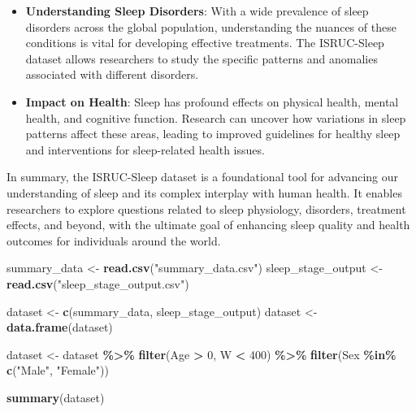 \documentclass[
]{article}
\newenvironment{Shaded}{\begin{snugshade}}{\end{snugshade}}
\newcommand{\DecValTok}[1]{\textcolor[rgb]{0.00,0.00,0.81}{#1}}
\newcommand{\FunctionTok}[1]{\textcolor[rgb]{0.13,0.29,0.53}{\textbf{#1}}}
\newcommand{\NormalTok}[1]{#1}
\newcommand{\OtherTok}[1]{\textcolor[rgb]{0.56,0.35,0.01}{#1}}
\newcommand{\SpecialCharTok}[1]{\textcolor[rgb]{0.81,0.36,0.00}{\textbf{#1}}}
\newcommand{\StringTok}[1]{\textcolor[rgb]{0.31,0.60,0.02}{#1}}
\begin{document}
\begin{itemize}
\item
  \textbf{Understanding Sleep Disorders}: With a wide prevalence of
  sleep disorders across the global population, understanding the
  nuances of these conditions is vital for developing effective
  treatments. The ISRUC-Sleep dataset allows researchers to study the
  specific patterns and anomalies associated with different disorders.
\item
  \textbf{Impact on Health}: Sleep has profound effects on physical
  health, mental health, and cognitive function. Research can uncover
  how variations in sleep patterns affect these areas, leading to
  improved guidelines for healthy sleep and interventions for
  sleep-related health issues.
\end{itemize}

In summary, the ISRUC-Sleep dataset is a foundational tool for advancing
our understanding of sleep and its complex interplay with human health.
It enables researchers to explore questions related to sleep physiology,
disorders, treatment effects, and beyond, with the ultimate goal of
enhancing sleep quality and health outcomes for individuals around the
world.

\begin{Shaded}
\begin{Highlighting}[]
\NormalTok{summary\_data }\OtherTok{\textless{}{-}} \FunctionTok{read.csv}\NormalTok{(}\StringTok{"summary\_data.csv"}\NormalTok{)}
\NormalTok{sleep\_stage\_output }\OtherTok{\textless{}{-}} \FunctionTok{read.csv}\NormalTok{(}\StringTok{"sleep\_stage\_output.csv"}\NormalTok{)}

\NormalTok{dataset }\OtherTok{\textless{}{-}} \FunctionTok{c}\NormalTok{(summary\_data, sleep\_stage\_output)}
\NormalTok{dataset }\OtherTok{\textless{}{-}} \FunctionTok{data.frame}\NormalTok{(dataset)}


\NormalTok{dataset }\OtherTok{\textless{}{-}}\NormalTok{ dataset }\SpecialCharTok{\%\textgreater{}\%}
  \FunctionTok{filter}\NormalTok{(Age }\SpecialCharTok{\textgreater{}} \DecValTok{0}\NormalTok{, W }\SpecialCharTok{\textless{}} \DecValTok{400}\NormalTok{) }\SpecialCharTok{\%\textgreater{}\%}
  \FunctionTok{filter}\NormalTok{(Sex }\SpecialCharTok{\%in\%} \FunctionTok{c}\NormalTok{(}\StringTok{"Male"}\NormalTok{, }\StringTok{"Female"}\NormalTok{))}
\end{Highlighting}
\end{Shaded}

\begin{Shaded}
\begin{Highlighting}[]
\FunctionTok{summary}\NormalTok{(dataset)}
\end{Highlighting}
\end{Shaded}
\end{document}
